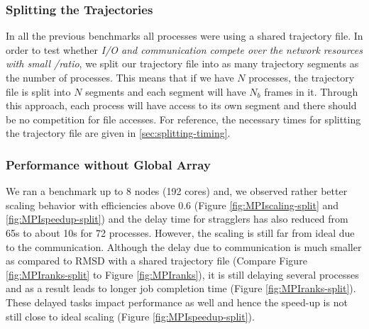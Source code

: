 \subsubsection{Splitting the Trajectories}
\label{splitting-traj}
In all the previous benchmarks all processes were using a shared trajectory file.
In order to test whether \emph{I/O and communication compete over the network resources with small \tcomp/\tIO ratio}, we split our trajectory file into as many trajectory segments as the number of processes.
This means that if we have $N$ processes, the trajectory file is split into $N$ segments and each segment will have $N_{b}$ frames in it. 
Through this approach, each process will have access to its own segment and there should be no competition for file accesses. 
For reference, the necessary times for splitting the trajectory file are given in \ref{sec:splitting-timing}.

\subsubsection*{Performance without Global Array}
We ran a benchmark up to 8 nodes (192 cores) and, we observed rather better scaling behavior with efficiencies above 0.6 (Figure \ref{fig:MPIscaling-split} and \ref{fig:MPIspeedup-split}) and the delay time for stragglers has also reduced from 65s to about 10s for 72 processes. 
However, the scaling is still far from ideal due to the communication. 
Although the delay due to communication is much smaller as compared to RMSD with a shared trajectory file (Compare Figure \ref{fig:MPIranks-split} to Figure \ref{fig:MPIranks}), it is still delaying several processes and as a result leads to longer job completion time (Figure \ref{fig:MPIranks-split}). 
These delayed tasks impact performance as well and hence the speed-up is not still close to ideal scaling (Figure \ref{fig:MPIspeedup-split}).

